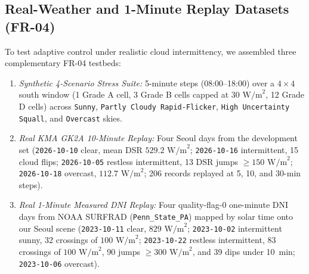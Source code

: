 \documentclass[conference]{IEEEtran}
\begin{document}
\subsection{Real-Weather and 1-Minute Replay Datasets (FR-04)}
To test adaptive control under realistic cloud intermittency, we assembled three complementary FR-04 testbeds:
\begin{enumerate}
\item \textit{Synthetic 4-Scenario Stress Suite:} 5-minute steps (08:00--18:00) over a $4 \times 4$ south window (1 Grade A cell, 3 Grade B cells capped at $30\text{ W/m}^2$, 12 Grade D cells) across \texttt{Sunny}, \texttt{Partly Cloudy Rapid-Flicker}, \texttt{High Uncertainty Squall}, and \texttt{Overcast} skies.
\item \textit{Real KMA GK2A 10-Minute Replay:} Four Seoul days from the development set (\texttt{2026-10-10} clear, mean DSR $529.2\text{ W/m}^2$; \texttt{2026-10-16} intermittent, 15 cloud flips; \texttt{2026-10-05} restless intermittent, 13 DSR jumps $\ge 150\text{ W/m}^2$; \texttt{2026-10-18} overcast, $112.7\text{ W/m}^2$; 206 records replayed at 5, 10, and 30-min steps).
\item \textit{Real 1-Minute Measured DNI Replay:} Four quality-flag-0 one-minute DNI days from NOAA SURFRAD (\texttt{Penn\_State\_PA}) \cite{b10} mapped by solar time onto our Seoul scene (\texttt{2023-10-11} clear, $829\text{ W/m}^2$; \texttt{2023-10-02} intermittent sunny, 32 crossings of $100\text{ W/m}^2$; \texttt{2023-10-22} restless intermittent, 83 crossings of $100\text{ W/m}^2$, 90 jumps $\ge 300\text{ W/m}^2$, and 39 dips under 10~min; \texttt{2023-10-06} overcast).
\end{enumerate}
\end{document}

